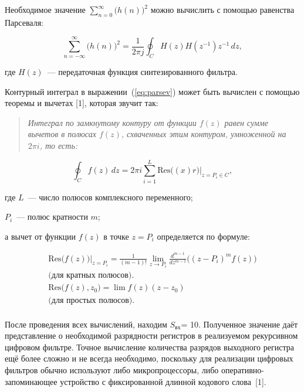 Необходимое значение $\sum_{n=0}^{\infty} \bigl(h(n)\bigr)^2$ можно
вычислить с помощью равенства Парсеваля:

\begin{equation}
  \label{eq:parsev}
  \sum_{n = -\infty}^{\infty}\bigl(h(n)\bigr)^2 = \frac{1}{2 \pi j}
  \oint_{C} H(z) H(z^{-1}) z^{-1} \, dz,
\end{equation}

\begin{ESKDexplanation}
\item[где ] $H(z)$~--- передаточная функция синтезированного фильтра.
\end{ESKDexplanation}

Контурный интеграл в выражении~(\ref{eq:parsev}) может быть вычислен с
помощью теоремы и вычетах [1], которая звучит так:

\begin{quote}
  \textit{Интеграл по замкнутому контуру от функции $f(z)$ равен сумме вычетов в
  полюсах $f(z)$, схваченных этим контуром, умноженной на $2\pi i$, то есть:}
\end{quote}

\begin{equation}
  \label{eq:kont_int}
  \oint_{C}f(z) \, dz = 2\pi i \sum_{i=1}^{L}
  \text{Res}\bigl((x)r\bigr)\Big|_{z = P_i \in C},
\end{equation}

\begin{ESKDexplanation}
\item[где ] $L$~--- число полюсов комплексного переменного;
\item $P_i$~--- полюс кратности $m$;
\item а вычет от функции $f(z)$ в точке $z = P_i$ определяется по формуле:
\end{ESKDexplanation}

\begin{gather*}
  \text{Res}\bigl(f(z)\bigr)\Big|_{z=P_i} = \frac{1}{(m-1)!} \lim
  \limits_{z \rightarrow P_i}
  \frac{d^{m-1}}{dz^{m-1}}\bigl((z-P_i)^mf(z)\bigr) \\
  \text{(для кратных полюсов)}.\\
  \text{Res}\bigl(f(z), z_0\bigr) = \lim f(z)(z-z_0) \\
  \text{(для простых полюсов)}.\\
\end{gather*}

После проведения всех вычислений, находим $S_{\text{вх}}$= 10. Полученное
значение даёт представление о необходимой разрядности регистров в
реализуемом рекурсивном цифровом фильтре. Точное вычисление количества
разрядов выходного регистра ещё более сложно и не всегда необходимо,
поскольку для реализации цифровых фильтров обычно используют либо
микропроцессоры, либо оперативно-запоминающее устройство с
фиксированной длинной кодового слова~[1].

